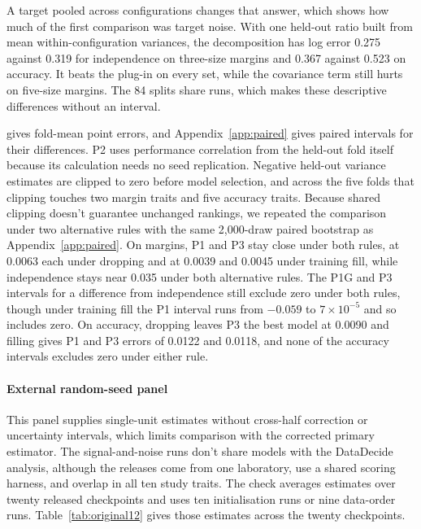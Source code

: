 A target pooled across configurations changes that answer, which shows how much of the first comparison was target noise. With one held-out ratio built from mean within-configuration variances, the decomposition has log error 0.275 against 0.319 for independence on three-size margins and 0.367 against 0.523 on accuracy. It beats the plug-in on every set, while the covariance term still hurts on five-size margins. The 84 splits share runs, which makes these descriptive differences without an interval.

 gives fold-mean point errors, and Appendix~\ref{app:paired} gives paired intervals for their differences. P2 uses performance correlation from the held-out fold itself because its calculation needs no seed replication. Negative held-out variance estimates are clipped to zero before model selection, and across the five folds that clipping touches two margin traits and five accuracy traits. Because shared clipping doesn't guarantee unchanged rankings, we repeated the comparison under two alternative rules with the same 2,000-draw paired bootstrap as Appendix~\ref{app:paired}. On margins, P1 and P3 stay close under both rules, at 0.0063 each under dropping and at 0.0039 and 0.0045 under training fill, while independence stays near 0.035 under both alternative rules. The P1G and P3 intervals for a difference from independence still exclude zero under both rules, though under training fill the P1 interval runs from $-0.059$ to $7\times10^{-5}$ and so includes zero. On accuracy, dropping leaves P3 the best model at 0.0090 and filling gives P1 and P3 errors of 0.0122 and 0.0118, and none of the accuracy intervals excludes zero under either rule.
\paragraph{External random-seed panel}
This panel supplies single-unit estimates without cross-half correction or uncertainty intervals, which limits comparison with the corrected primary estimator. The signal-and-noise runs don't share models with the DataDecide analysis, although the releases come from one laboratory, use a shared scoring harness, and overlap in all ten study traits. The check averages estimates over twenty released checkpoints and uses ten initialisation runs or nine data-order runs. Table~\ref{tab:original12} gives those estimates across the twenty checkpoints.

